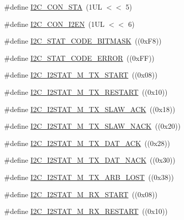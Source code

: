 \begin{DoxyCompactItemize}
\item 
\#define \hyperlink{group___i2_c__18_x_x__43_x_x_ga75e0835be79d812d1e6df8b0a5150365}{I2\+C\+\_\+\+C\+O\+N\+\_\+\+S\+TA}~(1\+U\+L $<$$<$ 5)
\item 
\#define \hyperlink{group___i2_c__18_x_x__43_x_x_ga5a696207d04d3694700e427a068409b1}{I2\+C\+\_\+\+C\+O\+N\+\_\+\+I2\+EN}~(1\+U\+L $<$$<$ 6)
\item 
\#define \hyperlink{group___i2_c__18_x_x__43_x_x_gafeb8b5f682a81a2cc32f6c4b720a5e1f}{I2\+C\+\_\+\+S\+T\+A\+T\+\_\+\+C\+O\+D\+E\+\_\+\+B\+I\+T\+M\+A\+SK}~((0x\+F8))
\item 
\#define \hyperlink{group___i2_c__18_x_x__43_x_x_gacfbf48ab1ed4f43314f63898ac827925}{I2\+C\+\_\+\+S\+T\+A\+T\+\_\+\+C\+O\+D\+E\+\_\+\+E\+R\+R\+OR}~((0x\+F\+F))
\item 
\#define \hyperlink{group___i2_c__18_x_x__43_x_x_ga5c44c05176052f6040cd40d680bc2a91}{I2\+C\+\_\+\+I2\+S\+T\+A\+T\+\_\+\+M\+\_\+\+T\+X\+\_\+\+S\+T\+A\+RT}~((0x08))
\item 
\#define \hyperlink{group___i2_c__18_x_x__43_x_x_gad41d0d1392b7d905b22b9c5015f2e48f}{I2\+C\+\_\+\+I2\+S\+T\+A\+T\+\_\+\+M\+\_\+\+T\+X\+\_\+\+R\+E\+S\+T\+A\+RT}~((0x10))
\item 
\#define \hyperlink{group___i2_c__18_x_x__43_x_x_gab91c158252efeb1a3a139faec3622ae0}{I2\+C\+\_\+\+I2\+S\+T\+A\+T\+\_\+\+M\+\_\+\+T\+X\+\_\+\+S\+L\+A\+W\+\_\+\+A\+CK}~((0x18))
\item 
\#define \hyperlink{group___i2_c__18_x_x__43_x_x_ga15729d9436fbf4c23a22e7cdbc913552}{I2\+C\+\_\+\+I2\+S\+T\+A\+T\+\_\+\+M\+\_\+\+T\+X\+\_\+\+S\+L\+A\+W\+\_\+\+N\+A\+CK}~((0x20))
\item 
\#define \hyperlink{group___i2_c__18_x_x__43_x_x_gad8c325e3c58aa8e7810797b9a6761596}{I2\+C\+\_\+\+I2\+S\+T\+A\+T\+\_\+\+M\+\_\+\+T\+X\+\_\+\+D\+A\+T\+\_\+\+A\+CK}~((0x28))
\item 
\#define \hyperlink{group___i2_c__18_x_x__43_x_x_ga234f86990a6fd63f1d2064cbca4709a3}{I2\+C\+\_\+\+I2\+S\+T\+A\+T\+\_\+\+M\+\_\+\+T\+X\+\_\+\+D\+A\+T\+\_\+\+N\+A\+CK}~((0x30))
\item 
\#define \hyperlink{group___i2_c__18_x_x__43_x_x_ga79230136402441c7e233c63fd2f71bdf}{I2\+C\+\_\+\+I2\+S\+T\+A\+T\+\_\+\+M\+\_\+\+T\+X\+\_\+\+A\+R\+B\+\_\+\+L\+O\+ST}~((0x38))
\item 
\#define \hyperlink{group___i2_c__18_x_x__43_x_x_gab1f79137c62e306269633b005ad936da}{I2\+C\+\_\+\+I2\+S\+T\+A\+T\+\_\+\+M\+\_\+\+R\+X\+\_\+\+S\+T\+A\+RT}~((0x08))
\item 
\#define \hyperlink{group___i2_c__18_x_x__43_x_x_gacb1c9145acd64a77464017f1dd9279c5}{I2\+C\+\_\+\+I2\+S\+T\+A\+T\+\_\+\+M\+\_\+\+R\+X\+\_\+\+R\+E\+S\+T\+A\+RT}~((0x10))

\end{DoxyCompactItemize}
